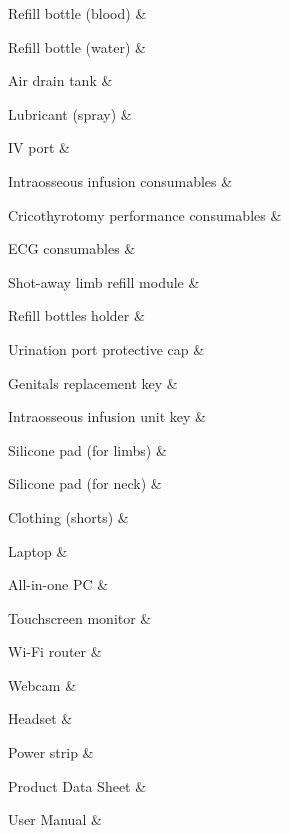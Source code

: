 {        Refill bottle (blood) & \\ \hline
        
        Refill bottle (water) & \\ \hline
        
        Air drain tank & \\ \hline
        
        Lubricant (spray) & \\ \hline
        
        IV port & \\ \hline
        
        Intraosseous infusion consumables & \\ \hline
        
        Cricothyrotomy performance consumables & \\ \hline
        
        ECG consumables & \\ \hline
        
        Shot-away limb refill module & \\ \hline
        
        Refill bottles holder & \\ \hline
        
        Urination port protective cap & \\ \hline
        
        Genitals replacement key & \\ \hline
        
        Intraosseous infusion unit key  & \\ \hline
        
        Silicone pad (for limbs) & \\ \hline
        
        Silicone pad (for neck) & \\ \hline
        
        Clothing (shorts) & \\ \hline
        
        Laptop & \\ \hline
        
        All-in-one PC & \\ \hline
        
        Touchscreen monitor & \\ \hline
        
        Wi-Fi router & \\ \hline
        
        Webcam & \\ \hline
        
        Headset & \\ \hline
        
        Power strip & \\ \hline
        
        Product Data Sheet & \\ \hline
        
        User Manual & \\ \hline

    
    }

